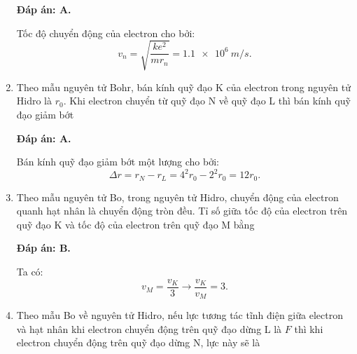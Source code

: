 \begin{enumerate}[label=\bfseries Câu \arabic*:]
	\loigiai
	{		\textbf{Đáp án: A.}
		
Tốc độ chuyển động của electron cho bởi:
$$
	v_{n} = \sqrt{\dfrac{k e^{2}}{m r_{n}}} = \SI{1,1 e6}{m/s}.
$$
		
	}
	
	\item {} 
		\cauhoi
	{Theo mẫu nguyên tử Bohr, bán kính quỹ đạo K của electron trong nguyên tử Hidro là $r_0$. Khi electron chuyển từ quỹ đạo N về quỹ đạo L thì bán kính quỹ đạo giảm bớt
	}
	
	\loigiai
	{		\textbf{Đáp án: A.}
		
Bán kính quỹ đạo giảm bớt một lượng cho bởi:
$$
	\Delta r = r_{N} - r_{L} = 4^{2} r_{0} - 2^{2} r_{0} = 12 r_{0}.
$$
		
	}
	
	\item {} 
	\cauhoi
	{Theo mẫu nguyên tử Bo, trong nguyên tử Hidro, chuyển động của electron quanh hạt nhân là chuyển động tròn đều. Tỉ số giữa tốc độ của electron trên quỹ đạo K và tốc độ của electron trên quỹ đạo M bằng
	}
	
	\loigiai
	{		\textbf{Đáp án: B.}
		
Ta có:
$$
	v_{M} = \dfrac{v_{K}}{3} \rightarrow \dfrac{v_{K}}{v_{M}} = \num{3}.
$$
		
	}
	
\item {} 
		\cauhoi
	{Theo mẫu Bo về nguyên tử Hidro, nếu lực tương tác tĩnh điện giữa electron và hạt nhân khi electron chuyển động trên quỹ đạo dừng L là $F$ thì khi electron chuyển động trên quỹ đạo dừng N, lực này sẽ là
	}
	

\end{enumerate}
